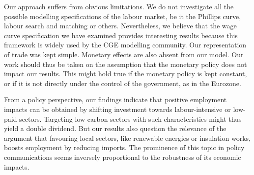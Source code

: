 Our approach suffers from obvious limitations. We do not investigate all the possible modelling specifications of the labour market, be it the Phillips curve, labour search and matching or others. Nevertheless, we believe that the wage curve specification we have examined provides interesting results because this framework is widely used by the CGE modelling community.
Our representation of trade was kept simple. Monetary effects are also absent from our model. Our work should thus be taken on the assumption that the monetary policy does not impact our results. This might hold true if the monetary policy is kept constant, or if it is not directly under the control of the government, as in the Eurozone.

From a policy perspective, our findings indicate that positive employment impacts can be obtained by shifting investment towards labour-intensive or low-paid sectors. Targeting low-carbon sectors with such characteristics might thus yield a double dividend.
But our results also question the relevance of the argument that favouring local sectors, like renewable energies or insulation works, boosts employment by reducing imports. The prominence of this topic in policy communications seems inversely proportional to the robustness of its economic impacts. 